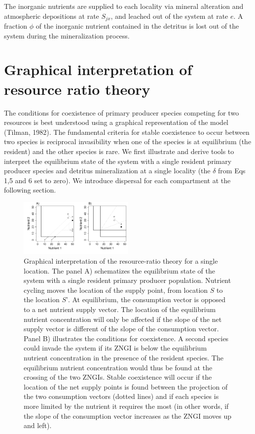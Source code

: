 \documentclass[letterpaper,twocolumn,showkeys]{revtex4-1}
\begin{document}
The inorganic nutrients are supplied to each locality via mineral alteration and atmospheric depositions at rate $S_{jx}$, and leached out of the system at rate $e$. A fraction $\phi$ of the inorganic nutrient contained in the detritus is lost out of the system during the mineralization process.

\section{Graphical interpretation of resource ratio theory}

The conditions for coexistence of primary producer species competing for two resources is best understood using a graphical representation of the model (Tilman, 1982). The fundamental criteria for stable coexistence to occur between two species is reciprocal invasibility when one of the species is at equilibrium (the resident) and the other species is rare. We first illustrate and derive tools to interpret the equilibrium state of the system with a single resident primary producer species and detritus mineralization at a single locality (the $\delta$ from Eqs 1,5 and 6 set to zero). We introduce dispersal for each compartment at the following section. 

\begin{figure}[tb!]
   \centering
   \includegraphics[width=0.5\textwidth]{R-Ratio_theory.pdf}
   \caption{Graphical interpretation of the resource-ratio theory for a single location. The panel A) schematizes the equilibrium state of the system with a single resident primary producer population. Nutrient cycling moves the location of the supply point, from location $S$ to the location $S’$. At equilibrium, the consumption vector is opposed to a net nutrient supply vector. The location of the equilibrium nutrient concentration will only be affected if the slope of the net supply vector is different of the slope of the consumption vector. Panel B) illustrates the conditions for coexistence. A second species could invade the system if its ZNGI is below the equilibrium nutrient concentration in the presence of the resident species. The equilibrium nutrient concentration would thus be found at the crossing of the two ZNGIs. Stable coexistence will occur if the location of the net supply points is found between the projection of the two consumption vectors (dotted lines) and if each species is more limited by the nutrient it requires the most (in other words, if the slope of the consumption vector increases as the ZNGI moves up and left).}
   \label{f:R-Ratio_theory}
\end{figure}
\end{document}
